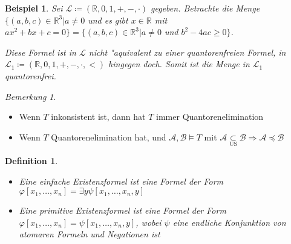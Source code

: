 \documentclass[a4paper,12pt,numbers=noenddot,parskip=full]{scrartcl}
\newcommand{\setR}{\mathbb{R}}
\newcommand{\scrL}{\mathcal{L}}
\newcommand{\scrA}{\mathcal{A}}
\newcommand{\scrB}{\mathcal{B}}
\theoremstyle{dotless}
\newtheorem{definition}[theorem]{Definition}
\newtheorem{example}[theorem]{Beispiel}
\theoremstyle{remark}
\newtheorem*{remark}{Bemerkung}
\begin{document}
\begin{example}
	Sei $\scrL \coloneqq (\setR, 0, 1, +, -, \cdot)$ gegeben. Betrachte die Menge $\{(a,b,c) \in \setR^3 | a \neq 0$ und es gibt $x \in \setR$ mit $ax^2+bx+c=0\} = \{(a,b,c) \in \setR^3 | a \neq 0$ und $b^2-4ac \geq 0\}$.
	
	Diese Formel ist in $\scrL$ nicht "aquivalent zu einer quantorenfreien Formel, in ${\scrL_1 \coloneqq (\setR, 0, 1, +, -, \cdot, <)}$ hingegen doch. Somit ist die Menge in $\scrL_1$ quantorenfrei.
\end{example}

\begin{remark}
	\begin{itemize}
		\item Wenn $T$ inkonsistent ist, dann hat $T$ immer Quantorenelimination
		\item Wenn $T$ Quantorenelimination hat, und $\scrA , \scrB \models T$ mit $\scrA \underset{\text{US}}{\subset} \scrB \Rightarrow \scrA \preceq \scrB$ 
	\end{itemize}
\end{remark}

\begin{definition}
	\begin{itemize}
		\item Eine einfache Existenzformel ist eine Formel der Form $\varphi[x_1, \dots, x_n]=\exists y \psi[x_1, \dots, x_n, y]$
		\item Eine primitive Existenzformel ist eine Formel der Form $\varphi[x_1, \dots, x_n]=\psi[x_1, \dots, x_n,y]$, wobei $\psi$ eine endliche Konjunktion von atomaren Formeln und Negationen ist
	\end{itemize}
\end{definition}
\end{document}
